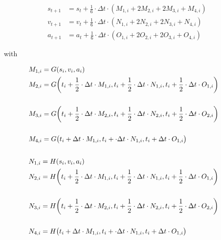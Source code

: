 \begin{align}
	s_{t+1} &= s_t + \frac{1}{6} \cdot \Delta t \cdot (M_{1,i} + 2 M_{2,i} +2M_{3,i} +M_{4,i} ) \\ v_{t+1} &= v_t + \frac{1}{6} \cdot \Delta t \cdot (N_{1,i} + 2 N_{2,i} +2N_{3,i} +N_{4,i} ) \\
	a_{t+1} &= a_t + \frac{1}{6} \cdot \Delta t \cdot (O_{1,i} + 2 O_{2,i} +2O_{3,i} +O_{4,i} ) 
\end{align}

with 

\begin{align}
M_{1,i} &= G(s_i, v_i, a_i) \\
M_{2,i} &\begin{multlined}[t]= G \biggl(t_i + \frac{1}{2} \cdot \Delta t \cdot M_{1,i}, t_i + \frac{1}{2} \cdot \Delta t \cdot N_{1,i}, t_i + \insertForSmartphone{\\} \frac{1}{2} \cdot \Delta t \cdot O_{1,i}\biggr) \\\end{multlined} \\
M_{3,i} &\begin{multlined}[t]= G \biggl(t_i + \frac{1}{2} \cdot \Delta t \cdot M_{2,i}, t_i + \frac{1}{2} \cdot \Delta t \cdot N_{2,i}, t_i + \insertForSmartphone{\\} \frac{1}{2} \cdot \Delta t \cdot O_{2,i}\biggr) \\ \end{multlined} \\
M_{4,i} &\begin{multlined}[t]= G \bigl(t_i +  \Delta t \cdot M_{1,i}, t_i + \cdot \Delta t \cdot N_{1,i}, t_i + \insertForSmartphone{\\} \Delta t \cdot O_{1,i}\bigr)\\ \end{multlined}
\end{align}
\begin{align}
N_{1,i} &= H(s_i, v_i, a_i) \\
N_{2,i} &\begin{multlined}[t]= H \biggl(t_i + \frac{1}{2} \cdot \Delta t \cdot M_{1,i}, t_i + \frac{1}{2} \cdot \Delta t \cdot N_{1,i}, t_i + \insertForSmartphone{\\} \frac{1}{2} \cdot \Delta t \cdot O_{1,i}\biggr)\\ \end{multlined} \\
N_{3,i} &\begin{multlined}[t]= H \biggl(t_i + \frac{1}{2} \cdot \Delta t \cdot M_{2,i}, t_i + \frac{1}{2} \cdot \Delta t \cdot N_{2,i}, t_i + \insertForSmartphone{\\} \frac{1}{2} \cdot \Delta t \cdot O_{2,i}\biggr)\\ \end{multlined} \\
N_{4,i} &\begin{multlined}[t]= H \bigl(t_i + \Delta t \cdot M_{1,i}, t_i + \cdot \Delta t \cdot N_{1,i}, t_i + \insertForSmartphone{\\} \Delta t \cdot O_{1,i}\bigr)\\ \end{multlined}
\end{align}
